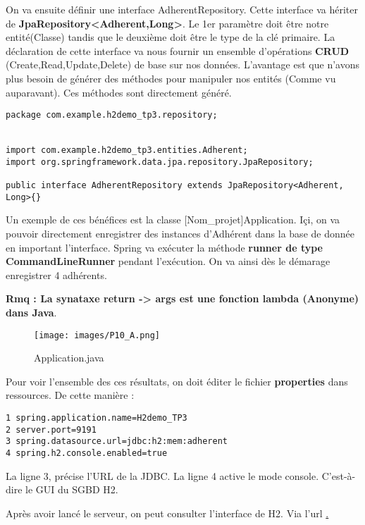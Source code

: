 \documentclass{rapport}
\begin{document}
On va ensuite définir une interface AdherentRepository. Cette interface va hériter de \textbf{JpaRepository<Adherent,Long>}. Le 1er paramètre doit être notre entité(Classe) tandis que le deuxième doit être le type de la clé primaire. La déclaration de cette interface va nous fournir un ensemble  d'opérations \textbf{CRUD} (Create,Read,Update,Delete) de base sur nos données. L'avantage est que n'avons plus besoin de générer des méthodes pour manipuler nos entités (Comme vu auparavant). Ces méthodes sont directement généré.\newline

\begin{lstlisting}
package com.example.h2demo_tp3.repository;


import com.example.h2demo_tp3.entities.Adherent;
import org.springframework.data.jpa.repository.JpaRepository;

public interface AdherentRepository extends JpaRepository<Adherent, Long>{}
\end{lstlisting}

Un exemple de ces bénéfices est la classe [Nom\_projet]Application. Içi, on va pouvoir directement enregistrer des instances d'Adhérent dans la base de donnée en important l'interface. Spring va exécuter la méthode \textbf{runner de type CommandLineRunner} pendant l'exécution. On va ainsi dès le démarage enregistrer 4 adhérents.

\textbf{Rmq : La synataxe \textbf{return -> args {} est une fonction lambda (Anonyme) dans Java}}.\newline

\begin{figure}[H]
	\centering
    \texttt{[image: images/P10\_A.png]}
    \caption{Application.java}
\end{figure}

Pour voir l'ensemble des ces résultats, on doit éditer le fichier \textbf{properties} dans ressources. De cette manière :
\begin{lstlisting}
1 spring.application.name=H2demo_TP3
2 server.port=9191
3 spring.datasource.url=jdbc:h2:mem:adherent
4 spring.h2.console.enabled=true
\end{lstlisting}

La ligne 3, précise l'URL de la JDBC. La ligne 4 active le mode console. C'est-à-dire le GUI du SGBD H2.\newline

Après avoir lancé le serveur, on peut consulter l'interface de H2. Via l'url \href{http://localhost:9191/h2-console}. 
\end{document}
